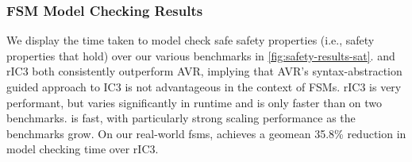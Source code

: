 \documentclass[acmsmall,screen,review]{acmart}
\begin{document}
\subsubsection{FSM Model Checking Results}
We display the time taken to model check safe safety properties (i.e., safety properties that hold) over our various benchmarks in \autoref{fig:safety-results-sat}.
\toolname{} and rIC3 both consistently outperform AVR, implying that AVR's syntax-abstraction guided approach to IC3 is not advantageous in the context of FSMs.
rIC3 is very performant, but varies significantly in runtime and is only faster than \toolname{} on two benchmarks.
\toolname{} is fast, with particularly strong scaling performance as the benchmarks grow.
On our real-world \acp{fsm}, \toolname{} achieves a geomean 35.8\% reduction in model checking time over rIC3.
\end{document}
